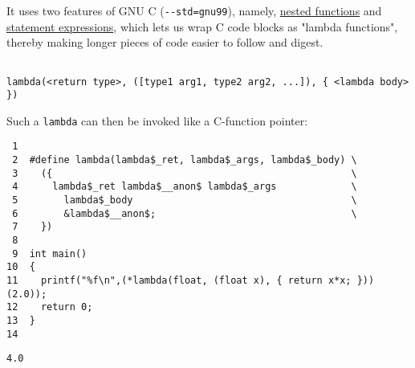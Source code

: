 \documentclass[a4paper, 12pt]{article}
\begin{document}
It uses two features of GNU C (\texttt{-{}-std=gnu99}), namely, \href{http://gcc.gnu.org/onlinedocs/gcc/Nested-Functions.html}{nested functions} and
\href{https://gcc.gnu.org/onlinedocs/gcc/Statement-Exprs.html}{statement expressions}, which lets us wrap C code blocks as "lambda functions",
thereby making longer pieces of code easier to follow and digest.

\begin{verbatim}

lambda(<return type>, ([type1 arg1, type2 arg2, ...]), { <lambda body>  })

\end{verbatim}

Such a \texttt{lambda} can then be invoked like a C-function pointer:

\begin{verbatim}
 1
 2  #define lambda(lambda$_ret, lambda$_args, lambda$_body) \
 3    ({                                                    \
 4      lambda$_ret lambda$__anon$ lambda$_args             \
 5        lambda$_body                                      \
 6        &lambda$__anon$;                                  \
 7    })
 8
 9  int main()
10  {
11    printf("%f\n",(*lambda(float, (float x), { return x*x; }))(2.0));
12    return 0;
13  }
14
\end{verbatim}

\begin{verbatim}
4.0
\end{verbatim}
\end{document}
